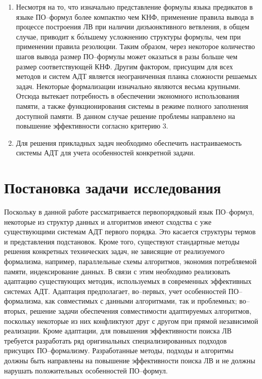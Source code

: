 \begin{enumerate}
\item Несмотря на то, что изначально представление формулы языка предикатов в языке ПО--формул более компактно чем КНФ, применение правила вывода в процессе построения ЛВ при наличии дизъюнктивного ветвления, в общем случае, приводит к б\'{о}льшему усложнению структуры формулы, чем при применении правила резолюции. Таким образом, через некоторое количество шагов вывода размер ПО--формулы может оказаться в разы больше чем размер соответствующей КНФ. Другим фактором, присущим для всех методов и систем АДТ является неограниченная планка сложности решаемых задач. Некоторые формализации изначально являются весьма крупными. Отсюда вытекает потребность в обеспечении экономного использования памяти, а также функционирования системы в режиме полного заполнения доступной памяти. В данном случае решение проблемы направлено на повышение эффективности согласно критерию 3.

\item Для решения прикладных задач необходимо обеспечить настраиваемость системы АДТ для учета особенностей конкретной задачи.
\end{enumerate}


\section{Постановка задачи исследования}
Поскольку в данной работе рассматривается первопорядковый язык ПО--формул, некоторые из структур данных и алгоритмов имеют сходства с уже существующими системам АДТ первого порядка. Это касается структуры термов и представления подстановок. Кроме того, существуют стандартные методы решения конкретных технических задач, не зависящие от реализуемого формализма, например, параллельные схемы алгоритмов, экономия потребляемой памяти, индексирование данных. В связи с этим необходимо реализовать адаптацию существующих методик, используемых в современных эффективных системах АДТ. Адаптация предполагает, во--первых, учет особенностей ПО--формализма, как совместимых с данными алгоритмами, так и проблемных; во--вторых, решение задачи обеспечения совместимости адаптируемых алгоритмов, поскольку некоторые из них конфликтуют друг с другом при прямой независимой реализации. Кроме адаптации, для повышения эффективности поиска ЛВ требуется разработать ряд оригинальных специализированных подходов присущих ПО--формализму. Разработанные методы, подходы и алгоритмы должны быть направлены на повышение эффективности поиска ЛВ и не должны нарушать положительных особенностей ПО--формул.



